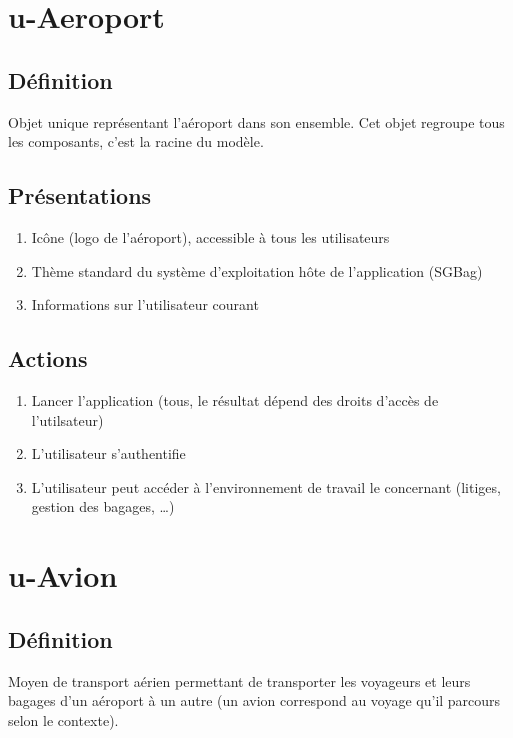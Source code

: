 \newcommand\topologie[1]{Ajouter, modifier ou supprimer #1 (configuration de la topologie de l'aéroport)}
\newcommand\selectionner[1]{Sélectionner #1 (afficher sa configuration)}
\newcommand\rectetiquette{Rectangle étiquetté}
\newcommand\transit{Visualizer le transit de bagages dans cette zone}
\newcommand\etat{Afficher l'état}

\section{u-Aeroport}
\subsection{Définition}
Objet unique représentant l'aéroport dans son ensemble. Cet objet regroupe tous les
composants, c'est la racine du modèle.

\subsection{Présentations}
\begin{enumerate}
	\item Icône (logo de l'aéroport), accessible à tous les utilisateurs
	\item Thème standard du système d'exploitation hôte de l'application (SGBag)
	\item Informations sur l'utilisateur courant
\end{enumerate}

\subsection{Actions}
\begin{enumerate}
	\item Lancer l'application (tous, le résultat dépend des droits d'accès de l'utilsateur)
	\item L'utilisateur s'authentifie
	\item L'utilisateur peut accéder à l'environnement de travail le concernant (litiges, gestion des bagages, \ldots)
\end{enumerate}

\section{u-Avion}
\subsection{Définition}
	Moyen de transport aérien permettant de transporter les voyageurs et leurs bagages d'un
	aéroport à un autre (un avion correspond au voyage qu'il parcours selon le contexte).

